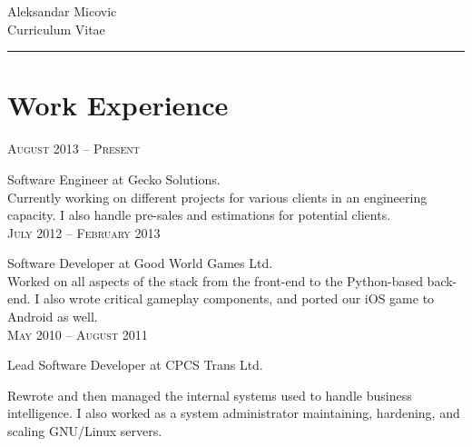 \documentclass[10pt]{article}
\begin{document}
\color{text1}
    \par{\centering
            {\sffamily\Huge Aleksandar Micovic}\\	
            {\color{headings} 
                {\LARGE Curriculum Vitae}
            }
        \\[20pt]\par}
    {\color{white} \hrule}

	
\begin{minipage}[t]{0.5\textwidth}
    \vspace{0pt}
	
\section{Work Experience}
    \raggedleft
    \textsc{\normalsize August 2013 -- Present}\par

    \raggedright\large Software Engineer at Gecko Solutions.\\

    \normalsize{Currently working on different projects for various clients in an engineering capacity. I also handle pre-sales and estimations for potential clients.}\\[10pt]

    \raggedleft
    \textsc{\normalsize July 2012 -- February 2013}\par

    \raggedright\large Software Developer at Good World Games Ltd.\\

    \normalsize{Worked on all aspects of the stack from the front-end to the
	Python-based back-end. I also wrote critical gameplay components, and ported 
	our iOS game to Android as well.}\\[10pt]

    \raggedleft
    \textsc{\normalsize May 2010 -- August 2011}\par

    \raggedright\large Lead Software Developer at CPCS Trans Ltd.

    \normalsize{Rewrote and then managed the internal systems used to handle business
	intelligence. I also worked as a system administrator maintaining, hardening, and 
	scaling GNU/Linux servers.}\\[10pt]


\end{minipage}
\end{document}
